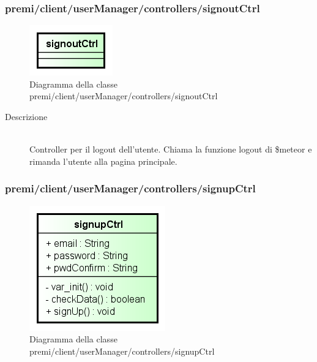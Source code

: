 \subsubsection{premi/client/userManager/controllers/signoutCtrl}
\begin{figure}[h]
\begin{center}
\includegraphics[scale=0.55]{img/diacla/signoutCtrl.png}
\caption{Diagramma della classe premi/client/userManager/controllers/signoutCtrl}
\end{center}
\end{figure}


\begin{description}
\item[Descrizione] \hfill \\
	Controller per il logout dell'utente. Chiama la funzione logout di \$meteor e rimanda l'utente alla pagina principale.
	
\end{description}





\subsubsection{premi/client/userManager/controllers/signupCtrl}
\begin{figure}[h]
\begin{center}
\includegraphics[scale=0.55]{img/diacla/signupCtrl.png}
\caption{Diagramma della classe premi/client/userManager/controllers/signupCtrl}
\end{center}
\end{figure}


